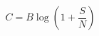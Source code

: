 \documentclass[14pt]{article}
\begin{document}
\pagestyle{empty}
\[ C = B \log (1 + \frac{S}{N})\]
\end{document}
